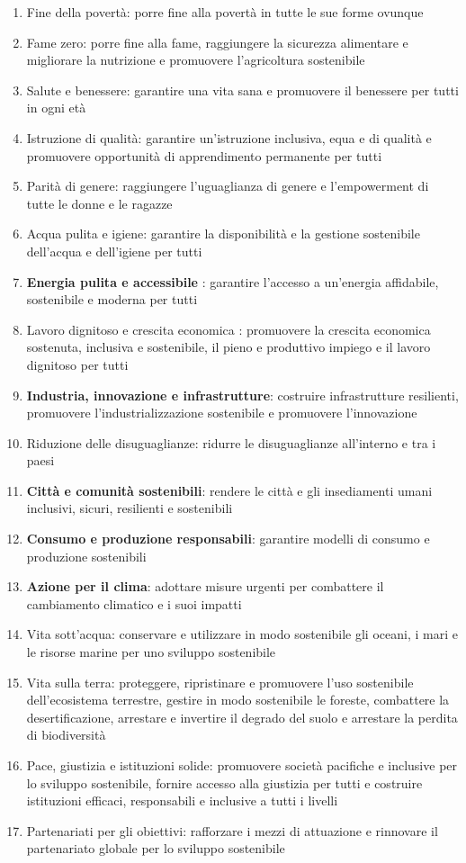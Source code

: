 \begin{enumerate}
    \item Fine della povertà: porre fine alla povertà in tutte le sue forme ovunque
    \item Fame zero: porre fine alla fame, raggiungere la sicurezza alimentare e migliorare la nutrizione e promuovere l'agricoltura sostenibile
    \item Salute e benessere: garantire una vita sana e promuovere il benessere per tutti in ogni età
    \item Istruzione di qualità: garantire un'istruzione inclusiva, equa e di qualità e promuovere opportunità di apprendimento permanente per tutti
    \item Parità di genere: raggiungere l'uguaglianza di genere e l'empowerment di tutte le donne e le ragazze
    \item Acqua pulita e igiene: garantire la disponibilità e la gestione sostenibile dell'acqua e dell'igiene per tutti
    \item \textbf{Energia pulita e accessibile} : garantire l'accesso a un'energia affidabile, sostenibile e moderna per tutti
    \item Lavoro dignitoso e crescita economica : promuovere la crescita economica sostenuta, inclusiva e sostenibile, il pieno e produttivo impiego e il lavoro dignitoso per tutti
    \item \textbf{Industria, innovazione e infrastrutture}: costruire infrastrutture resilienti, promuovere l'industrializzazione sostenibile e promuovere l'innovazione
    \item Riduzione delle disuguaglianze: ridurre le disuguaglianze all'interno e tra i paesi
    \item \textbf{Città e comunità sostenibili}: rendere le città e gli insediamenti umani inclusivi, sicuri, resilienti e sostenibili
    \item \textbf{Consumo e produzione responsabili}: garantire modelli di consumo e produzione sostenibili
    \item \textbf{Azione per il clima}: adottare misure urgenti per combattere il cambiamento climatico e i suoi impatti
    \item Vita sott'acqua: conservare e utilizzare in modo sostenibile gli oceani, i mari e le risorse marine per uno sviluppo sostenibile
    \item Vita sulla terra: proteggere, ripristinare e promuovere l'uso sostenibile dell'ecosistema terrestre, gestire in modo sostenibile le foreste, combattere la desertificazione, arrestare e invertire il degrado del suolo e arrestare la perdita di biodiversità
    \item Pace, giustizia e istituzioni solide: promuovere società pacifiche e inclusive per lo sviluppo sostenibile, fornire accesso alla giustizia per tutti e costruire istituzioni efficaci, responsabili e inclusive a tutti i livelli
    \item Partenariati per gli obiettivi: rafforzare i mezzi di attuazione e rinnovare il partenariato globale per lo sviluppo sostenibile
\end{enumerate}



